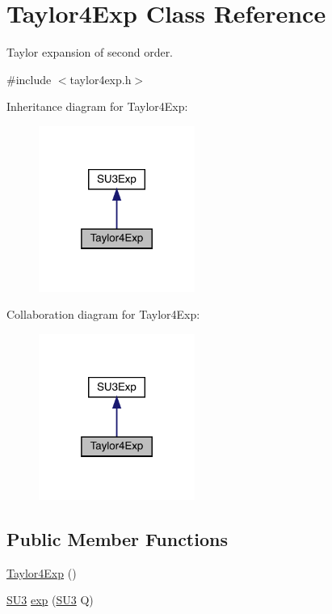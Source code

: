 \hypertarget{class_taylor4_exp}{}\section{Taylor4\+Exp Class Reference}
\label{class_taylor4_exp}


Taylor expansion of second order.  




{\ttfamily \#include $<$taylor4exp.\+h$>$}



Inheritance diagram for Taylor4\+Exp\+:
\nopagebreak
\begin{figure}[H]
\begin{center}
\leavevmode
\includegraphics[width=145pt]{class_taylor4_exp__inherit__graph}
\end{center}
\end{figure}


Collaboration diagram for Taylor4\+Exp\+:
\nopagebreak
\begin{figure}[H]
\begin{center}
\leavevmode
\includegraphics[width=145pt]{class_taylor4_exp__coll__graph}
\end{center}
\end{figure}
\subsection*{Public Member Functions}
\begin{DoxyCompactItemize}
\item 
\mbox{\hyperlink{class_taylor4_exp_a0eac1c3288d296110c6a5e11acc0934d}{Taylor4\+Exp}} ()
\item 
\mbox{\hyperlink{class_s_u3}{S\+U3}} \mbox{\hyperlink{class_taylor4_exp_a08f0d6d994f45b23b401b5cdc260e7ae}{exp}} (\mbox{\hyperlink{class_s_u3}{S\+U3}} Q)
\end{DoxyCompactItemize}



